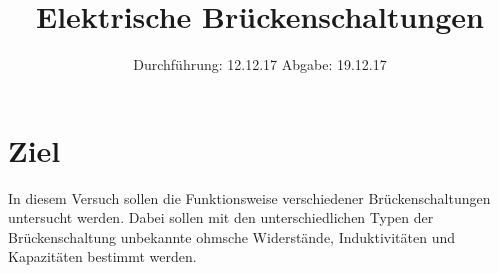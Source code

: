 

\subject{V302}
\title{Elektrische Brückenschaltungen}
\date{%
  Durchführung: 12.12.17
  \hspace{3em}
  Abgabe: 19.12.17
}



\maketitle
\thispagestyle{empty}
\tableofcontents
\newpage

\section{Ziel}
\label{sec:Ziel}
In diesem Versuch sollen die Funktionsweise verschiedener Brückenschaltungen untersucht werden.
Dabei sollen mit den unterschiedlichen Typen der Brückenschaltung unbekannte ohmsche Widerstände, Induktivitäten und Kapazitäten bestimmt werden.






\printbibliography{}


